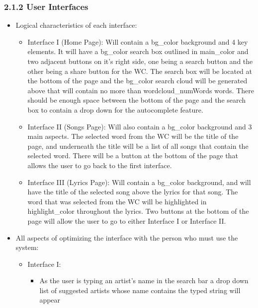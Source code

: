 \documentclass[]{article}
\begin{document}
\subsubsection{2.1.2 User Interfaces}\label{user-interfaces}

\begin{itemize}
\itemsep1pt\parskip0pt
\item
  Logical characteristics of each interface:

  \begin{itemize}
  \itemsep1pt\parskip0pt
  \item
    Interface I (Home Page): Will contain a bg\_color background and 4
    key elements. It will have a bg\_color search box outlined in
    main\_color and two adjacent buttons on it's right side, one being a
    search button and the other being a share button for the WC. The
    search box will be located at the bottom of the page and the
    bg\_color search cloud will be generated above that will contain no
    more than wordcloud\_numWords words. There should be enough space
    between the bottom of the page and the search box to contain a drop
    down for the autocomplete feature.
  \item
    Interface II (Songs Page): Will also contain a bg\_color background
    and 3 main aspects. The selected word from the WC will be the title
    of the page, and underneath the title will be a list of all songs
    that contain the selected word. There will be a button at the bottom
    of the page that allows the user to go back to the first interface.
  \item
    Interface III (Lyrics Page): Will contain a bg\_color background,
    and will have the title of the selected song above the lyrics for
    that song. The word that was selected from the WC will be
    highlighted in highlight\_color throughout the lyrics. Two buttons
    at the bottom of the page will allow the user to go to either
    Interface I or Interface II.
  \end{itemize}
\item
  All aspects of optimizing the interface with the person who must use
  the system:

  \begin{itemize}
  \itemsep1pt\parskip0pt
  \item
    Interface I:

    \begin{itemize}
    \itemsep1pt\parskip0pt
    \item
      As the user is typing an artist's name in the search bar a drop
      down list of suggested artists whose name contains the typed
      string will appear


\end{itemize}
\end{itemize}
\end{itemize}
\end{document}
